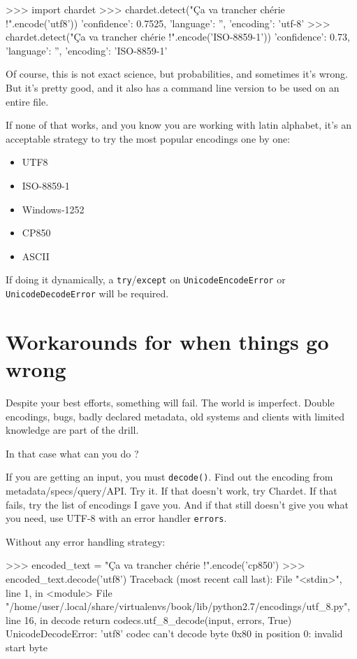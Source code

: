 \begin{py2and3}
>>> import chardet
>>> chardet.detect("Ça va trancher chérie !".encode('utf8'))
{'confidence': 0.7525, 'language': '', 'encoding': 'utf-8'}
>>> chardet.detect("Ça va trancher chérie !".encode('ISO-8859-1'))
{'confidence': 0.73, 'language': '', 'encoding': 'ISO-8859-1'}
\end{py2and3}

Of course, this is not exact science, but probabilities, and sometimes it's wrong. But it's pretty good, and it also has a command line version to be used on an entire file.

If none of that works, and you know you are working with latin alphabet, it's an acceptable strategy to try the most popular encodings one by one:

\begin{itemize}
\item UTF8
\item ISO-8859-1
\item Windows-1252
\item CP850
\item ASCII
\end{itemize}

If doing it dynamically, a \lstinline{try}/\lstinline{except} on \lstinline{UnicodeEncodeError} or \lstinline{UnicodeDecodeError} will be required.

\section{Workarounds for when things go wrong}

Despite your best efforts, something will fail. The world is imperfect. Double encodings, bugs, badly declared metadata, old systems and clients with limited knowledge are part of the drill.

In that case what can you do ?

If you are getting an input, you must \lstinline{decode()}. Find out the encoding from metadata/specs/query/API. Try it. If that doesn't work, try Chardet. If that fails, try the list of encodings I gave you. And if that still doesn't give you what you need, use UTF-8 with an error handler \lstinline{errors}.

Without any error handling strategy:

\begin{py3}
>>> encoded_text = "Ça va trancher chérie !".encode('cp850')
>>> encoded_text.decode('utf8')
Traceback (most recent call last):
  File "<stdin>", line 1, in <module>
  File "/home/user/.local/share/virtualenvs/book/lib/python2.7/encodings/utf_8.py", line 16, in decode
    return codecs.utf_8_decode(input, errors, True)
UnicodeDecodeError: 'utf8' codec can't decode byte 0x80 in position 0: invalid start byte
\end{py3}

